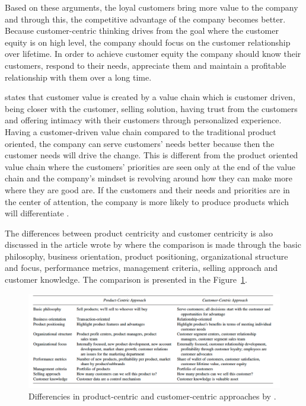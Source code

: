 Based on these arguments, the loyal customers bring more value to the company and through this, the competitive advantage of the company becomes better. Because customer-centric thinking drives from the goal where the customer equity is on high level, the company should focus on the customer relationship over lifetime. In order to achieve customer equity the company should know their customers, respond to their needs, appreciate them and maintain a profitable relationship with them over a long time. \parencite{Parniangtong:2017}

\textcite{Parniangtong:2017} states that customer value is created by a value chain which is customer driven, being closer with the customer, selling solution, having trust from the customers and offering intimacy with their customers through personalized experience. Having a customer-driven value chain compared to the traditional product oriented, the company can serve customers' needs better because then the customer needs will drive the change. This is different from the product oriented value chain where the customers' priorities are seen only at the end of the value chain and the company's mindset is revolving around how they can make more where they are good are. If the customers and their needs and priorities are in the center of attention, the company is more likely to produce products which will differentiate \parencite{Parniangtong:2017}.

The differences between product centricity and customer centricity is also discussed in the article wrote by \textcite{PathToCustomerCentricity:2006} where the comparison is made through the basic philosophy, business orientation, product positioning, organizational structure and focus, performance metrics, management criteria, selling approach and customer knowledge. The comparison is presented in the Figure~\ref{fig:productvscustomer}.

\begin{figure}[ht]
  \begin{center}
    \includegraphics[scale=2, width=\textwidth]{dippa/images/ProductVsCustomer.png}
    \caption{Differencies in product-centric and customer-centric approaches by \textcite{PathToCustomerCentricity:2006}.}
    \label{fig:productvscustomer}
  \end{center}
\end{figure}


